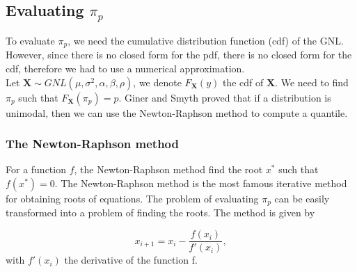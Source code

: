 \documentclass[12pt,travaildirige,nobabel, twoside]{dms}
\numberwithin{equation}{section}
\numberwithin{table}{chapter}
\numberwithin{figure}{chapter}
\begin{document}
\subsection{Evaluating $\pi_p$}


To evaluate $\pi_p$, we need the cumulative distribution function (cdf) of the GNL. However, since there is no closed form for the pdf, there is no closed form for the cdf, therefore we had to use a numerical approximation.\\


Let $\textbf{X}\sim GNL(\mu,\sigma^2,\alpha,\beta,\rho)$, we denote $F_\textbf{X}(y)$ the cdf of \textbf{X}. We need to find $\pi_p$ such that $F_\textbf{X}(\pi_p)=p$. Giner and Smyth \citep{unimodal} proved that if a distribution is unimodal, then we can use the Newton-Raphson method to compute a quantile. \\

\subsubsection{The Newton-Raphson method}

For a function $f$, the Newton-Raphson method find the root $x^*$ such that $f(x^*)=0$. The Newton-Raphson method is the most famous iterative method for obtaining roots of equations. The problem of evaluating $\pi_p$ can be easily transformed into a problem of finding the roots. The method is given by 

\begin{equation}
x_{i+1}=x_i-\frac{f(x_i)}{f'(x_i)},
\end{equation}
with $f'(x_i)$ the derivative of the function f. \\
\end{document}
